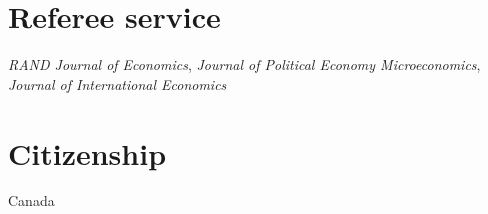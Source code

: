 \documentclass[11pt]{article} %
\begin{document}
\section*{Referee service}

\textit{RAND Journal of Economics}, \textit{Journal of Political Economy Microeconomics},
\textit{Journal of International Economics}

%
%
%


\section*{Citizenship}

Canada

%
%



\vfill %
\end{document}
